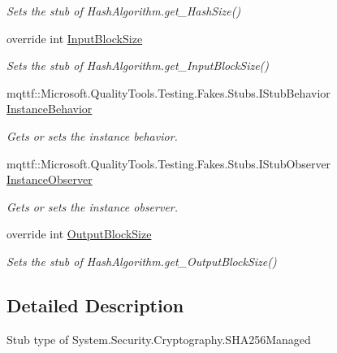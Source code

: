 \begin{DoxyCompactItemize}
\begin{DoxyCompactList}\small\item\em Sets the stub of Hash\-Algorithm.\-get\-\_\-\-Hash\-Size()\end{DoxyCompactList}\item 
override int \hyperlink{class_system_1_1_security_1_1_cryptography_1_1_fakes_1_1_stub_s_h_a256_managed_a4aa2588dff4e451f30ac7c1bbe96d663}{Input\-Block\-Size}
\begin{DoxyCompactList}\small\item\em Sets the stub of Hash\-Algorithm.\-get\-\_\-\-Input\-Block\-Size()\end{DoxyCompactList}\item 
mqttf\-::\-Microsoft.\-Quality\-Tools.\-Testing.\-Fakes.\-Stubs.\-I\-Stub\-Behavior \hyperlink{class_system_1_1_security_1_1_cryptography_1_1_fakes_1_1_stub_s_h_a256_managed_a1e3b88e269f6a103ad0da2faaa4a373a}{Instance\-Behavior}
\begin{DoxyCompactList}\small\item\em Gets or sets the instance behavior.\end{DoxyCompactList}\item 
mqttf\-::\-Microsoft.\-Quality\-Tools.\-Testing.\-Fakes.\-Stubs.\-I\-Stub\-Observer \hyperlink{class_system_1_1_security_1_1_cryptography_1_1_fakes_1_1_stub_s_h_a256_managed_ae40902458a93c2bef0cf6bcd4df1d415}{Instance\-Observer}
\begin{DoxyCompactList}\small\item\em Gets or sets the instance observer.\end{DoxyCompactList}\item 
override int \hyperlink{class_system_1_1_security_1_1_cryptography_1_1_fakes_1_1_stub_s_h_a256_managed_a9b8f6b31ef057fd2b3fc71e801b0f4ad}{Output\-Block\-Size}
\begin{DoxyCompactList}\small\item\em Sets the stub of Hash\-Algorithm.\-get\-\_\-\-Output\-Block\-Size()\end{DoxyCompactList}\end{DoxyCompactItemize}


\subsection{Detailed Description}
Stub type of System.\-Security.\-Cryptography.\-S\-H\-A256\-Managed



